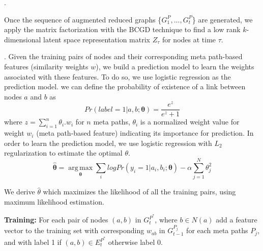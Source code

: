 .

Once the sequence of augmented reduced graphs \{$G^P_1, ..., G^P_t$\} are generated, we apply the matrix factorization with the BCGD technique \cite{Zhu2016} to find a low rank $k$-dimensional latent space representation matrix $Z_\tau$ for nodes at time $\tau$.






. Given the training pairs of nodes and their corresponding meta path-based features (similarity weights $w$), we build a prediction model to learn the weights associated with these features. To do so, we use logistic regression as the prediction model. we can define the probability of existence of a link between nodes $a$ and $b$ as 
\begin{equation*}
Pr(label = 1|a, b; \boldsymbol{\theta}) = \frac{e^{z}}{e^{z}+1}
\end{equation*}
where $z=\sum\limits_{i=1}^{n}\theta_i.w_i$ for $n$ meta paths, $\theta_i$ is a normalized weight value for weight $w_i$ (meta path-based feature) indicating its importance for prediction. In order to learn the prediction model, we use
logistic regression with $L_2$ regularization to estimate the optimal $\theta$. \begin{equation*}
\boldsymbol{\hat{\theta}} = 
\operatorname*{arg\,max}_{\boldsymbol{\theta}}\sum_i log Pr(y_i = 1|a_i, b_i; \boldsymbol{\theta}) - \alpha \sum_{j=1}^N \theta_j^2
\end{equation*}

We derive \textbf{$\hat{\theta}$} which maximizes the likelihood of all the training pairs, using maximum likelihood estimation.


\textbf{Training:} For each pair of nodes $(a,b)$ in $G^{P^*}_{t}$, where $b \in N(a)$ add a feature vector to the training set with corresponding $w_{ab}$ in $G^{P_j}_{t-1}$ for each meta paths $P_j$, and with label 1 if $(a,b) \in E^{P^*}_{t}$ otherwise label 0.

